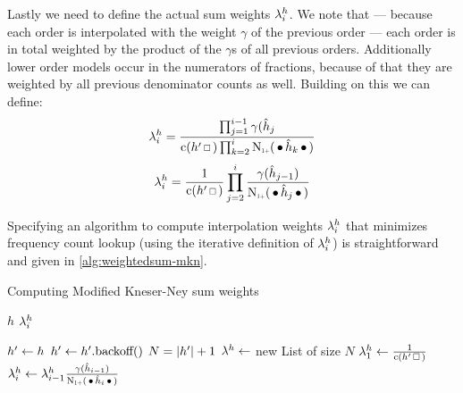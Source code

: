 Lastly we need to define the actual sum weights $\lambda_i^h$.
We note that --- because each order is interpolated with the weight $\gamma$ of
the previous order --- each order is in total weighted by the product of the
$\gamma$s of all previous orders.
Additionally lower order models occur in the numerators of fractions, because of
that they are weighted by all previous denominator counts as well.
Building on this we can define:
\begin{equation}
  \label{eq:mkn-sumweight}
  \SumWeight_i^h = \frac{\prod_{j = 1}^{i - 1} \gamma(\DerivedHistory[j]}
                        {\Count(\SeenHistory \Skp) \prod_{k = 2}^{i} \ContCountIp(\WSkp \DerivedHistory[k] \WSkp)}
\end{equation}
\begin{equation}
  \SumWeight_i^h = \frac{1}{\Count(\SeenHistory \Skp)} \prod_{j = 2}^i \frac{\gamma(\DerivedHistory[j-1])}{\ContCountIp(\WSkp \DerivedHistory[j] \WSkp)}
\end{equation}


Specifying an algorithm to compute interpolation weights $\lambda_i^h$ that
minimizes frequency count lookup (using the iterative definition of
$\lambda_i^h$) is straightforward and given in \cref{alg:weightedsum-mkn}.

\begin{algorithm}
  \caption{Computing Modified Kneser-Ney sum weights}
  \label{alg:weightedsum-mkn}
  \begin{algorithmic}[1]
    \Require $h$
    \Ensure $\lambda_i^h$

    \State $h^\prime \gets h$
      \State $h^\prime \gets h^\prime\text{.backoff()}$
    \EndWhile
    \State $N = {\left|h^\prime\right|} + 1$
    \State $\lambda^h \gets$ new List of size $N$
    \State $\SumWeight_1^h \gets \frac{1}{\Count(\SeenHistory \Skp)}$
      \State $\SumWeight_i^h \gets \SumWeight_{i-1}^h \frac{\gamma(\DerivedHistory[i-1])}{\ContCountIp(\WSkp \DerivedHistory[i] \WSkp)}$
    \EndFor
  \end{algorithmic}
\end{algorithm}

